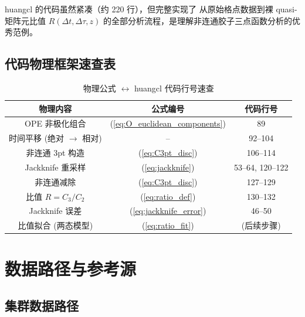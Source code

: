 \documentclass[12pt,a4paper]{ctexart}
\begin{document}
huangcl 的代码虽然紧凑（约 220 行），但完整实现了
从原始格点数据到裸 quasi-矩阵元比值 $R(\Delta t, \Delta\tau, z)$
的全部分析流程，是理解非连通胶子三点函数分析的优秀范例。

\subsection{代码物理框架速查表}

\begin{table}[H]
\centering
\caption{物理公式 $\leftrightarrow$ huangcl 代码行号速查}
\begin{tabular}{c|c|c}
\toprule
\textbf{物理内容} & \textbf{公式编号} & \textbf{代码行号} \\
\midrule
OPE 非极化组合 & (\ref{eq:O_euclidean_components}) & 89 \\
时间平移 (绝对 $\to$ 相对) & -- & 92--104 \\
非连通 3pt 构造 & (\ref{eq:C3pt_disc}) & 106--114 \\
Jackknife 重采样 & (\ref{eq:jackknife}) & 53--64, 120--122 \\
非连通减除 & (\ref{eq:C3pt_disc}) & 127--129 \\
比值 $R = C_3/C_2$ & (\ref{eq:ratio_def}) & 130--132 \\
Jackknife 误差 & (\ref{eq:jackknife_error}) & 46--50 \\
比值拟合 (两态模型) & (\ref{eq:ratio_fit}) & (后续步骤) \\
\bottomrule
\end{tabular}
\end{table}


\appendix
\section{数据路径与参考源}

\subsection{集群数据路径}
\end{document}
